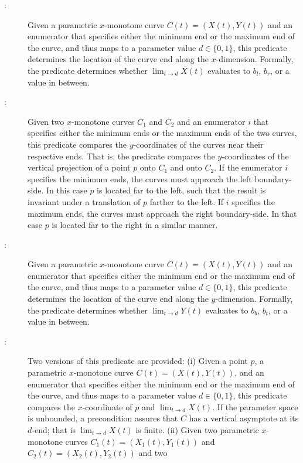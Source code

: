 \begin{description}
\item[:]
  Given a parametric $x$-monotone curve $C(t) = (X(t),Y(t))$ and an
  enumerator that specifies either the minimum end or the maximum end
  of the curve, and thus maps to a parameter value $d \in \{0,1\}$,
  this predicate determines the location of the curve end along the
  $x$-dimension. Formally, the predicate determines whether
  $\lim_{t \rightarrow d} X(t)$ evaluates to $b_l$, $b_r$, or a value
  in between.
\item[:]
  Given two $x$-monotone curves $C_1$ and $C_2$ and an enumerator $i$
  that specifies either the minimum ends or the maximum ends of the
  two curves, this predicate compares the $y$-coordinates of the
  curves near their respective ends. That is, the predicate compares
  the $y$-coordinates of the vertical projection of a point $p$ onto
  $C_1$ and onto $C_2$. If the enumerator $i$ specifies the minimum
  ends, the curves must approach the left boundary-side. In this case
  $p$ is located far to the left, such that the result is invariant
  under a translation of $p$ farther to the left. If $i$ specifies the
  maximum ends, the curves must approach the right boundary-side. In
  that case $p$ is located far to the right in a similar manner.
\item[:]
  Given a parametric $x$-monotone curve $C(t) = (X(t),Y(t))$ and an
  enumerator that specifies either the minimum end or the maximum end
  of the curve, and thus maps to a parameter value $d \in \{0,1\}$,
  this predicate determines the location of the curve end along the
  $y$-dimension. Formally, the predicate determines whether
  $\lim_{t \rightarrow d} Y(t)$ evaluates to $b_b$, $b_t$, or a value
  in between.
\item[:]
  Two versions of this predicate are provided:
  (i) Given a point $p$, a parametric $x$-monotone curve
    $C(t) = (X(t),Y(t))$, and an enumerator that specifies either the
    minimum end or the maximum end of the curve, and thus maps to a
    parameter value $d \in \{0,1\}$, this predicate compares the
    $x$-coordinate of $p$ and $\lim_{t \rightarrow d} X(t)$. If the
    parameter space is unbounded, a precondition assures that $C$
    has a vertical asymptote at its $d$-end; that is
    $\lim_{t \rightarrow d} X(t)$ is finite.
  (ii) Given two parametric $x$-monotone curves
    $C_1(t) = (X_1(t),Y_1(t))$ and $C_2(t) = (X_2(t),Y_2(t))$ and two

\end{description}
